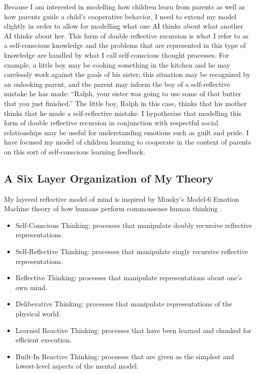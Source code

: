 Because I am interested in modelling how children learn from parents
as well as how parents guide a child's cooperative behavior, I need
to extend my model slightly in order to allow for modelling what one
AI thinks about what another AI thinks about her. This form of
double reflective recursion is what I refer to as a self-conscious
knowledge and the problems that are represented in this type of
knowledge are handled by what I call self-conscious thought
processes. For example, a little boy may be cooking something in the
kitchen and he may carelessly work against the goals of his sister;
this situation may be recognized by an onlooking parent, and the
parent may inform the boy of a self-reflective mistake he has made:
``Ralph, your sister was going to use some of that butter that you just
finished.'' The little boy, Ralph in this case, thinks that his mother
thinks that he made a self-reflective mistake. I hypothesize that
modelling this form of double reflective recursion in conjunction with
respectful social relationships may be useful for understanding
emotions such as guilt and pride. I have focused my model of
children learning to cooperate in the context of parents on this sort
of self-conscious learning feedback.

\subsection{A Six Layer Organization of My Theory}

My layered reflective model of mind is inspired by Minsky's Model-6
Emotion Machine theory of how humans perform commonsense human
thinking \citep{minsky:2006}.

\begin{itemize}
\item{Self-Conscious Thinking: processes that manipulate doubly recursive reflective representations.}
\item{Self-Reflective Thinking: processes that manipulate singly recursive reflective representations.}
\item{Reflective Thinking: processes that manipulate representations about one's own mind.}
\item{Deliberative Thinking: processes that manipulate representations of the physical world.}
\item{Learned Reactive Thinking: processes that have been learned and chunked for efficient execution.}
\item{Built-In Reactive Thinking: processes that are given as the simplest and lowest-level aspects of the mental model.}
\end{itemize}


